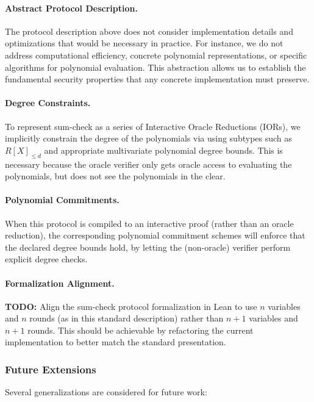 \paragraph{Abstract Protocol Description.} The protocol description above does not consider implementation details and optimizations that would be necessary in practice. For instance, we do not address computational efficiency, concrete polynomial representations, or specific algorithms for polynomial evaluation. This abstraction allows us to establish the fundamental security properties that any concrete implementation must preserve.

\paragraph{Degree Constraints.} To represent sum-check as a series of Interactive Oracle Reductions (IORs), we implicitly constrain the degree of the polynomials via using subtypes such as $R[X]_{\leq d}$ and appropriate multivariate polynomial degree bounds. This is necessary because the oracle verifier only gets oracle access to evaluating the polynomials, but does not see the polynomials in the clear.

\paragraph{Polynomial Commitments.} When this protocol is compiled to an interactive proof (rather than an oracle reduction), the corresponding polynomial commitment schemes will enforce that the declared degree bounds hold, by letting the (non-oracle) verifier perform explicit degree checks.

\paragraph{Formalization Alignment.} \textbf{TODO:} Align the sum-check protocol formalization in Lean to use $n$ variables and $n$ rounds (as in this standard description) rather than $n+1$ variables and $n+1$ rounds. This should be achievable by refactoring the current implementation to better match the standard presentation.

\subsubsection{Future Extensions}

Several generalizations are considered for future work:


